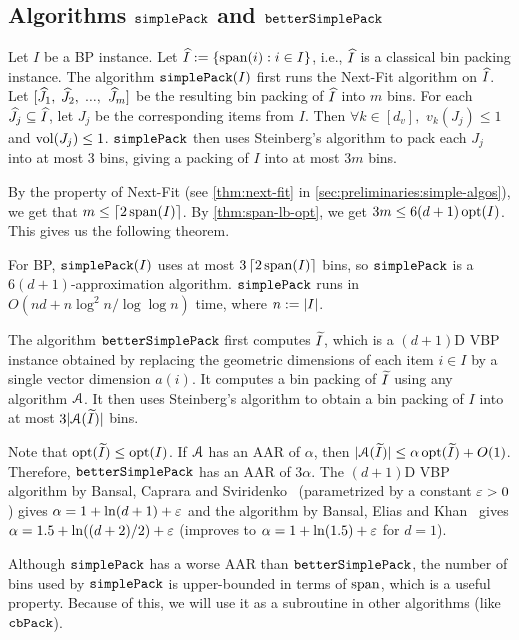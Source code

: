 \subsection{Algorithms \texorpdfstring{$\operatorname{\mathtt{simplePack}}$}{simple-pack}
and \texorpdfstring{$\operatorname{\mathtt{betterSimplePack}}$}{better-simple-pack}}
\label{sec:span-pack}

Let $I$ be a  BP instance.
Let $\widehat{I} := \{\operatorname{span}(i): i \in I\}$, i.e., $\widehat{I}$ is a classical bin packing instance.
The algorithm $\operatorname{\mathtt{simplePack}}(I)$ first runs the Next-Fit algorithm on $\widehat{I}$.
Let $[\widehat{J}_1,$ $\widehat{J}_2,$ $\ldots,$ $\widehat{J}_m]$
be the resulting bin packing of $\widehat{I}$ into $m$ bins.
For each $\widehat{J}_j \subseteq \widehat{I}$, let $J_j$ be the corresponding items from $I$.
Then $\forall k \in [d_v],$ $v_k(J_j) \le 1$ and $\operatorname{vol}(J_j) \le 1$.
$\operatorname{\mathtt{simplePack}}$ then uses Steinberg's algorithm to pack each $J_j$ into at most 3 bins,
giving a packing of $I$ into at most $3m$ bins.

By the property of Next-Fit (see \cref{thm:next-fit} in \cref{sec:preliminaries:simple-algos}),
we get that $m \le \left\lceil 2\operatorname{span}(I) \right\rceil$.
By \cref{thm:span-lb-opt}, we get $3m \le 6(d+1)\operatorname{opt}(I)$.
This gives us the following theorem.
\begin{theorem}
\label{thm:span-pack}
For  BP, $\operatorname{\mathtt{simplePack}}(I)$ uses at most $3\left\lceil 2\operatorname{span}(I) \right\rceil$ bins,
so $\operatorname{\mathtt{simplePack}}$ is a $6(d+1)$-approximation algorithm.
$\operatorname{\mathtt{simplePack}}$ runs in $O(nd + n\log^2 n/\log\log n)$ time,
where $n := |I|$.
\end{theorem}

The algorithm $\operatorname{\mathtt{betterSimplePack}}$ first computes $\widetilde{I}$,
which is a $(d+1)$D VBP instance obtained by
replacing the geometric dimensions of each item $i \in I$ by a single vector dimension $a(i)$.
It computes a bin packing of $\widetilde{I}$ using any algorithm $\mathcal{A}$.
It then uses Steinberg's algorithm to obtain a bin packing
of $I$ into at most $3|\mathcal{A}(\widetilde{I})|$ bins.

Note that $\operatorname{opt}(\widetilde{I}) \le \operatorname{opt}(I)$.
If $\mathcal{A}$ has an AAR of $\alpha$, then $|\mathcal{A}(\widetilde{I})| \le \alpha\operatorname{opt}(\widetilde{I}) + O(1)$.
Therefore, $\operatorname{\mathtt{betterSimplePack}}$ has an AAR of $3\alpha$.
The $(d+1)$D VBP algorithm by Bansal, Caprara and Sviridenko~\cite{rna}
(parametrized by a constant $\varepsilon > 0$) gives $\alpha = 1+\ln(d+1)+\varepsilon$
and the algorithm by Bansal, Elias and Khan~\cite{bansal2016improved} gives
$\alpha = 1.5+\ln((d+2)/2)+\varepsilon$ (improves to $\alpha = 1+\ln(1.5)+\varepsilon$ for $d=1$).

Although $\operatorname{\mathtt{simplePack}}$ has a worse AAR than $\operatorname{\mathtt{betterSimplePack}}$,
the number of bins used by $\operatorname{\mathtt{simplePack}}$ is upper-bounded in terms of $\operatorname{span}$,
which is a useful property. Because of this,
we will use it as a subroutine in other algorithms (like $\operatorname{\mathtt{cbPack}}$).

